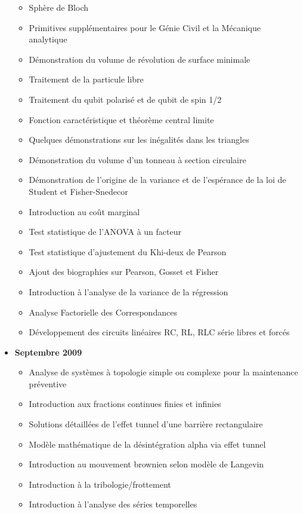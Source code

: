 \begin{itemize}
\begin{itemize}[noitemsep]
				\item Sphère de Bloch
				\item Primitives supplémentaires pour le Génie Civil et la Mécanique analytique
				\item Démonstration du volume de révolution de surface minimale
				\item Traitement de la particule libre
				\item Traitement du qubit polarisé et de qubit de spin 1/2
				\item Fonction caractéristique et théorème central limite
				\item Quelques démonstrations sur les inégalités dans les triangles
				\item Démonstration du volume d'un tonneau à section circulaire
				\item Démonstration de l'origine de la variance et de l'espérance de la loi de Student et Fisher-Snedecor
				\item Introduction au coût marginal
				\item Test statistique de l'ANOVA à un facteur
				\item Test statistique d'ajustement du Khi-deux de Pearson
				\item Ajout des biographies sur Pearson, Gosset et Fisher
				\item Introduction à l'analyse de la variance de la régression
				\item Analyse Factorielle des Correspondances
				\item Développement des circuits linéaires RC, RL, RLC série libres et forcés
			\end{itemize}
		\item \textbf{Septembre 2009}
			\begin{itemize}[noitemsep]
				\item Analyse de systèmes à topologie simple ou complexe pour la maintenance préventive
				\item Introduction aux fractions continues finies et infinies
				\item Solutions détaillées de l'effet tunnel d'une barrière rectangulaire
				\item Modèle mathématique de la désintégration alpha via effet tunnel
				\item Introduction au mouvement brownien selon modèle de Langevin
				\item Introduction à la tribologie/frottement
				\item Introduction à l'analyse des séries temporelles

\end{itemize}
\end{itemize}
